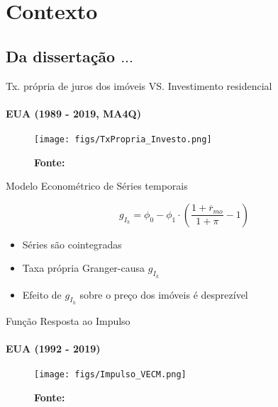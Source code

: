\section[Contexto]{Contexto}

\subsection{Da dissertação $\ldots$}

\begin{frame}{Tx. própria de juros dos imóveis VS. Investimento residencial}
\framesubtitle{EUA (1989 - 2019, MA4Q)}
    \begin{figure}
        \centering
        \texttt{[image: figs/TxPropria\_Investo.png]}
        \caption*{\textbf{Fonte:} \textcite{petrini_demanda_2019}}
    \end{figure}

\end{frame}

\begin{frame}{Modelo Econométrico de Séries temporais}
    
    
\begin{equation}
    \tag{Tx. Própria}
    g_{I_h} = \phi_0 - \phi_1\cdot \left(\frac{1+\overline r_{mo}}{1+\pi} - 1\right)
\end{equation}

\begin{itemize}
    \item Séries são cointegradas
    \item Taxa própria Granger-causa $g_{I_h}$
    \item Efeito de $g_{I_h}$ sobre o preço dos imóveis é desprezível
\end{itemize}
    
\end{frame}

\begin{frame}{Função Resposta ao Impulso}
\framesubtitle{EUA (1992 - 2019)}
    \begin{figure}
        \centering
        \texttt{[image: figs/Impulso\_VECM.png]}
        \caption*{\textbf{Fonte:} \textcite{petrini_demanda_2019}}
    \end{figure}
\end{frame}


